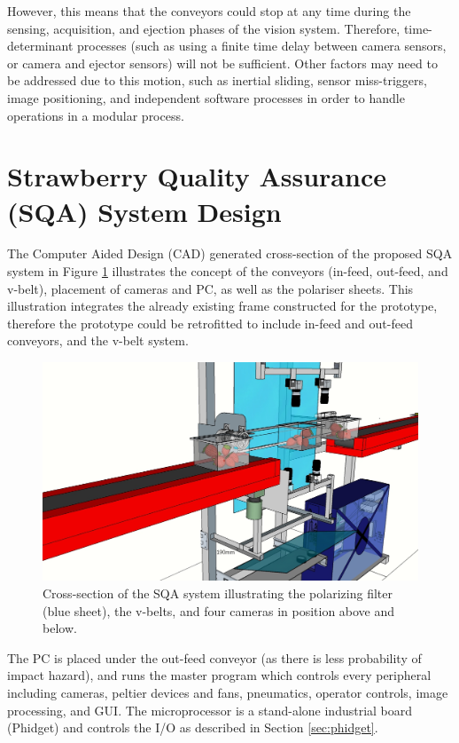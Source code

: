 \documentclass[fleqn,twoside,12pt]{report}
\begin{document}
However, this means that the conveyors could stop at any time during the sensing, acquisition, and ejection phases of the vision system. Therefore, time-determinant processes (such as using a finite time delay between camera sensors, or camera and ejector sensors) will not be sufficient. Other factors may need to be addressed due to this motion, such as inertial sliding, sensor miss-triggers, image positioning, and independent software processes in order to handle operations in a modular process. 



\section{Strawberry Quality Assurance (SQA) System Design}


The Computer Aided Design (CAD) generated cross-section of the proposed SQA system in Figure \ref{fig:cross_sec} illustrates the concept of the conveyors (in-feed, out-feed, and v-belt), placement of cameras and PC, as well as the polariser sheets. This illustration integrates the already existing frame constructed for the prototype, therefore the prototype could be retrofitted to include in-feed and out-feed conveyors, and the v-belt system.  



\begin{figure}[h]
	\centering
	\includegraphics[width=.8\linewidth]{QAS_cross_sec.jpg}
	\caption{Cross-section of the SQA system illustrating the polarizing filter (blue sheet), the v-belts, and four cameras in position above and below.}
	\label{fig:cross_sec}
\end{figure}%



The PC is placed under the out-feed conveyor (as there is less probability of impact hazard), and runs the master program which controls every peripheral including cameras, peltier devices and fans, pneumatics, operator controls, image processing, and GUI. The microprocessor is a stand-alone industrial board (Phidget\texttrademark) and controls the I/O as described in Section \ref{sec:phidget}.
\end{document}
